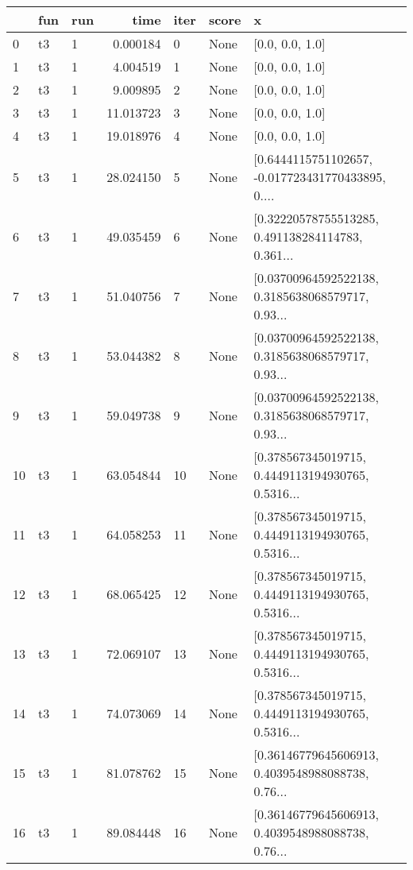 \begin{tabular}{lllrlll}
\toprule
{} & fun & run &        time & iter & score &                                                  x \\
\midrule
0   &  t3 &   1 &    0.000184 &    0 &  None &                                    [0.0, 0.0, 1.0] \\
1   &  t3 &   1 &    4.004519 &    1 &  None &                                    [0.0, 0.0, 1.0] \\
2   &  t3 &   1 &    9.009895 &    2 &  None &                                    [0.0, 0.0, 1.0] \\
3   &  t3 &   1 &   11.013723 &    3 &  None &                                    [0.0, 0.0, 1.0] \\
4   &  t3 &   1 &   19.018976 &    4 &  None &                                    [0.0, 0.0, 1.0] \\
5   &  t3 &   1 &   28.024150 &    5 &  None &  [0.6444115751102657, -0.017723431770433895, 0.... \\
6   &  t3 &   1 &   49.035459 &    6 &  None &  [0.32220578755513285, 0.491138284114783, 0.361... \\
7   &  t3 &   1 &   51.040756 &    7 &  None &  [0.03700964592522138, 0.3185638068579717, 0.93... \\
8   &  t3 &   1 &   53.044382 &    8 &  None &  [0.03700964592522138, 0.3185638068579717, 0.93... \\
9   &  t3 &   1 &   59.049738 &    9 &  None &  [0.03700964592522138, 0.3185638068579717, 0.93... \\
10  &  t3 &   1 &   63.054844 &   10 &  None &  [0.378567345019715, 0.4449113194930765, 0.5316... \\
11  &  t3 &   1 &   64.058253 &   11 &  None &  [0.378567345019715, 0.4449113194930765, 0.5316... \\
12  &  t3 &   1 &   68.065425 &   12 &  None &  [0.378567345019715, 0.4449113194930765, 0.5316... \\
13  &  t3 &   1 &   72.069107 &   13 &  None &  [0.378567345019715, 0.4449113194930765, 0.5316... \\
14  &  t3 &   1 &   74.073069 &   14 &  None &  [0.378567345019715, 0.4449113194930765, 0.5316... \\
15  &  t3 &   1 &   81.078762 &   15 &  None &  [0.36146779645606913, 0.4039548988088738, 0.76... \\
16  &  t3 &   1 &   89.084448 &   16 &  None &  [0.36146779645606913, 0.4039548988088738, 0.76... \\

\end{tabular}
